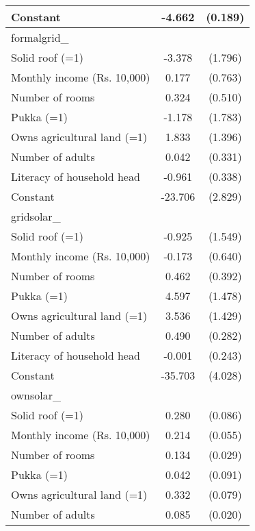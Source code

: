 \begin{table}[htbp]
\begin{tabular}{l*{1}{cc}}
Constant            &      -4.662\sym{***}&     (0.189)\\
\midrule
formalgrid\_         &                     &            \\
Solid roof (=1)     &      -3.378\sym{*}  &     (1.796)\\
Monthly income (Rs. 10,000)&       0.177         &     (0.763)\\
Number of rooms     &       0.324         &     (0.510)\\
Pukka (=1)          &      -1.178         &     (1.783)\\
Owns agricultural land (=1)&       1.833         &     (1.396)\\
Number of adults    &       0.042         &     (0.331)\\
Literacy of household head&      -0.961\sym{***}&     (0.338)\\
Constant            &     -23.706\sym{***}&     (2.829)\\
\midrule
gridsolar\_          &                     &            \\
Solid roof (=1)     &      -0.925         &     (1.549)\\
Monthly income (Rs. 10,000)&      -0.173         &     (0.640)\\
Number of rooms     &       0.462         &     (0.392)\\
Pukka (=1)          &       4.597\sym{***}&     (1.478)\\
Owns agricultural land (=1)&       3.536\sym{**} &     (1.429)\\
Number of adults    &       0.490\sym{*}  &     (0.282)\\
Literacy of household head&      -0.001         &     (0.243)\\
Constant            &     -35.703\sym{***}&     (4.028)\\
\midrule
ownsolar\_           &                     &            \\
Solid roof (=1)     &       0.280\sym{***}&     (0.086)\\
Monthly income (Rs. 10,000)&       0.214\sym{***}&     (0.055)\\
Number of rooms     &       0.134\sym{***}&     (0.029)\\
Pukka (=1)          &       0.042         &     (0.091)\\
Owns agricultural land (=1)&       0.332\sym{***}&     (0.079)\\
Number of adults    &       0.085\sym{***}&     (0.020)\\

\end{tabular}
\end{table}
